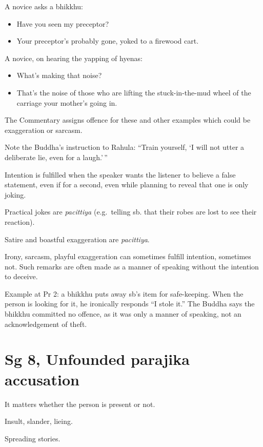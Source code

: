 A novice asks a bhikkhu:

\begin{itemize}
\tightlist
\item
  Have you seen my preceptor?
\item
  Your preceptor's probably gone, yoked to a firewood cart.
\end{itemize}

A novice, on hearing the yapping of hyenas:

\begin{itemize}
\tightlist
\item
  What's making that noise?
\item
  That's the noise of those who are lifting the stuck-in-the-mud wheel
  of the carriage your mother's going in.
\end{itemize}

The Commentary assigns offence for these and other examples which could
be exaggeration or sarcasm.

Note the Buddha's instruction to Rahula: ``Train yourself, `I will not
utter a deliberate lie, even for a laugh.'\,''

Intention is fulfilled when the speaker wants the listener to believe a
false statement, even if for a second, even while planning to reveal
that one is only joking.

Practical jokes are \emph{pacittiya} (e.g.~telling sb. that their robes
are lost to see their reaction).

Satire and boastful exaggeration are \emph{pacittiya}.

Irony, sarcasm, playful exaggeration can sometimes fulfill intention,
sometimes not. Such remarks are often made as a manner of speaking
without the intention to deceive.

Example at Pr 2: a bhikkhu puts away sb's item for safe-keeping. When
the person is looking for it, he ironically responds ``I stole it.'' The
Buddha says the bhikkhu committed no offence, as it was only a manner of
speaking, not an acknowledgement of theft.

\section{Sg 8, Unfounded parajika accusation}

It matters whether the person is present or not.

Insult, slander, lieing.

Spreading stories.


